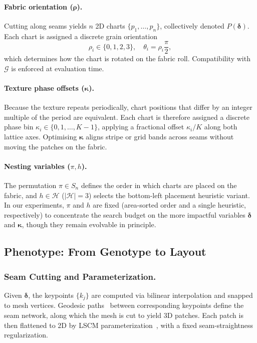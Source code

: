 \paragraph{Fabric orientation ($\boldsymbol{\rho}$).}
Cutting along seams yields $n$ 2D charts $\{p_1, \dots, p_n\}$,
collectively denoted $P(\boldsymbol{\delta})$.
Each chart is assigned a discrete grain orientation
\[
\rho_i \in \{0,1,2,3\}, \quad \theta_i = \rho_i \frac{\pi}{2},
\]
which determines how the chart is rotated on the fabric roll.
Compatibility with $\mathcal{G}$ is enforced at evaluation time.

\paragraph{Texture phase offsets ($\boldsymbol{\kappa}$).}
Because the texture repeats periodically, chart positions that differ by an
integer multiple of the period are equivalent.
Each chart is therefore assigned a discrete phase bin
$\kappa_i \in \{0,1,\dots,K{-}1\}$,
applying a fractional offset $\kappa_i / K$ along both lattice axes.
Optimising $\boldsymbol{\kappa}$ aligns stripe or grid bands across seams
without moving the patches on the fabric.

\paragraph{Nesting variables ($\pi, h$).}
The permutation $\pi \in S_n$ defines the order in which charts are placed
on the fabric, and $h \in \mathcal{H}$ ($|\mathcal{H}|=3$) selects the
bottom-left placement heuristic variant.
In our experiments, $\pi$ and $h$ are fixed (area-sorted order and a single
heuristic, respectively) to concentrate the search budget on the more
impactful variables $\boldsymbol{\delta}$ and $\boldsymbol{\kappa}$, though
they remain evolvable in principle.

\subsection{Phenotype: From Genotype to Layout}
\label{sec:phenotype}

\subsubsection{Seam Cutting and Parameterization.}
Given $\boldsymbol{\delta}$, the keypoints $\{k_j\}$ are computed via
bilinear interpolation and snapped to mesh vertices.
Geodesic paths~\cite{SharpC20} between corresponding keypoints define the
seam network, along which the mesh is cut to yield 3D patches.
Each patch is then flattened to 2D by LSCM
parameterization~\cite{LevyPRM02}, with a fixed seam-straightness
regularization.

